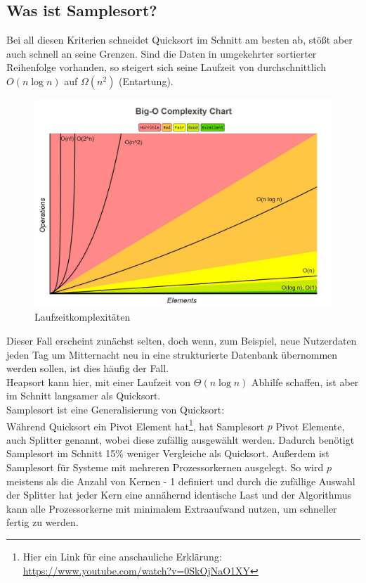 	\subsection{Was ist Samplesort?}
		Bei all diesen Kriterien schneidet Quicksort im Schnitt am besten ab, stößt aber auch schnell an seine Grenzen. 
		Sind die Daten in umgekehrter sortierter Reihenfolge vorhanden, so steigert sich seine Laufzeit von durchschnittlich $O(n\log{n})$ auf $\Omega(n^2)$ (Entartung).\\
		\begin{figure}
			\caption{Laufzeitkomplexitäten \autocite{unknown-author-2021}}
			\centering
			\includegraphics[width=\paperwidth-2in]{bigo.jpeg}
		\end{figure}
		Dieser Fall erscheint zunächst selten, doch wenn, zum Beispiel, neue Nutzerdaten jeden Tag um Mitternacht neu in eine strukturierte Datenbank übernommen werden sollen, ist dies häufig der Fall.\\
		Heapsort kann hier, mit einer Laufzeit von $\Theta(n\log{n})$ Abhilfe schaffen, ist aber im Schnitt langsamer als Quicksort.\\
		Samplesort ist eine Generalisierung von Quicksort:\\
		Während Quicksort ein Pivot Element hat\footnote{Hier ein Link für eine anschauliche Erklärung: \hyperlink{https://www.youtube.com/watch?v=0SkOjNaO1XY}{https://www.youtube.com/watch?v=0SkOjNaO1XY}}, hat Samplesort $p$ Pivot Elemente, auch Splitter genannt, wobei diese zufällig ausgewählt werden.
		Dadurch benötigt Samplesort im Schnitt 15\% weniger Vergleiche als Quicksort. \autocite{frazer-1970}
		Außerdem ist Samplesort für Systeme mit mehreren Prozessorkernen ausgelegt.
		So wird $p$ meistens als die Anzahl von Kernen - 1 definiert und durch die zufällige Auswahl der Splitter hat jeder Kern eine annähernd identische Last und der Algorithmus kann alle Prozessorkerne mit minimalem Extraaufwand nutzen, um schneller fertig zu werden.\\
